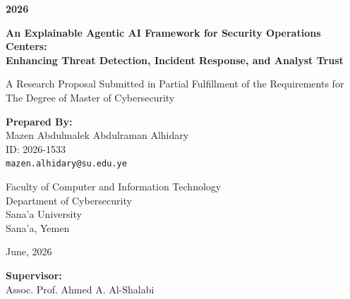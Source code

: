 \documentclass[12pt,a4paper]{report}
\begin{document}
\begin{titlepage}
    \centering
    \vspace*{1cm}
    
    {\Large \textbf{2026}}
    
    \vspace{1.5cm}
    
    {\LARGE \textbf{An Explainable Agentic AI Framework for Security Operations Centers:}}\\[0.4cm]
    {\LARGE \textbf{Enhancing Threat Detection, Incident Response, and Analyst Trust}}
    
    \vspace{2cm}
    
    {\large A Research Proposal Submitted in Partial Fulfillment of the Requirements for The Degree of Master of Cybersecurity}
    
    \vspace{2cm}
    
    \textbf{Prepared By:}\\
    Mazen Abdulmalek Abdulraman Alhidary\\
    ID: 2026-1533\\
    \texttt{mazen.alhidary@su.edu.ye}
    
    \vspace{1.5cm}
    
    Faculty of Computer and Information Technology\\
    Department of Cybersecurity\\
    Sana'a University\\
    Sana'a, Yemen
    
    \vspace{1cm}
    
    June, 2026
    
    \vspace{1cm}
    
    \textbf{Supervisor:}\\
    Assoc. Prof. Ahmed A. Al-Shalabi
    
    \vfill
\end{titlepage}
\end{document}
